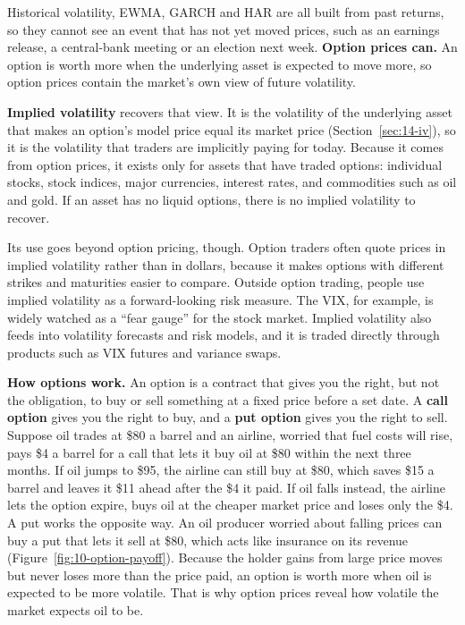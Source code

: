 Historical volatility, EWMA, GARCH and HAR are all built from past returns, so they cannot see an event that has not yet moved prices, such as an earnings release, a central-bank meeting or an election next week. \textbf{Option prices can.} An option is worth more when the underlying asset is expected to move more, so option prices contain the market's own view of future volatility.


\textbf{Implied volatility} recovers that view. It is the volatility of the underlying asset that makes an option's model price equal its market price (Section~\ref{sec:14-iv}), so it is the volatility that traders are implicitly paying for today. Because it comes from option prices, it exists only for assets that have traded options: individual stocks, stock indices, major currencies, interest rates, and commodities such as oil and gold. If an asset has no liquid options, there is no implied volatility to recover.

Its use goes beyond option pricing, though. Option traders often quote prices in implied volatility rather than in dollars, because it makes options with different strikes and maturities easier to compare. Outside option trading, people use implied volatility as a forward-looking risk measure. The VIX, for example, is widely watched as a ``fear gauge'' for the stock market. Implied volatility also feeds into volatility forecasts and risk models, and it is traded directly through products such as VIX futures and variance swaps.

\begin{callout}
\textbf{How options work.} An option is a contract that gives you the right, but not the obligation, to buy or sell something at a fixed price before a set date. A \textbf{call option} gives you the right to buy, and a \textbf{put option} gives you the right to sell. Suppose oil trades at \$80 a barrel and an airline, worried that fuel costs will rise, pays \$4 a barrel for a call that lets it buy oil at \$80 within the next three months. If oil jumps to \$95, the airline can still buy at \$80, which saves \$15 a barrel and leaves it \$11 ahead after the \$4 it paid. If oil falls instead, the airline lets the option expire, buys oil at the cheaper market price and loses only the \$4. A put works the opposite way. An oil producer worried about falling prices can buy a put that lets it sell at \$80, which acts like insurance on its revenue (Figure~\ref{fig:10-option-payoff}). Because the holder gains from large price moves but never loses more than the price paid, an option is worth more when oil is expected to be more volatile. That is why option prices reveal how volatile the market expects oil to be.
\end{callout}


